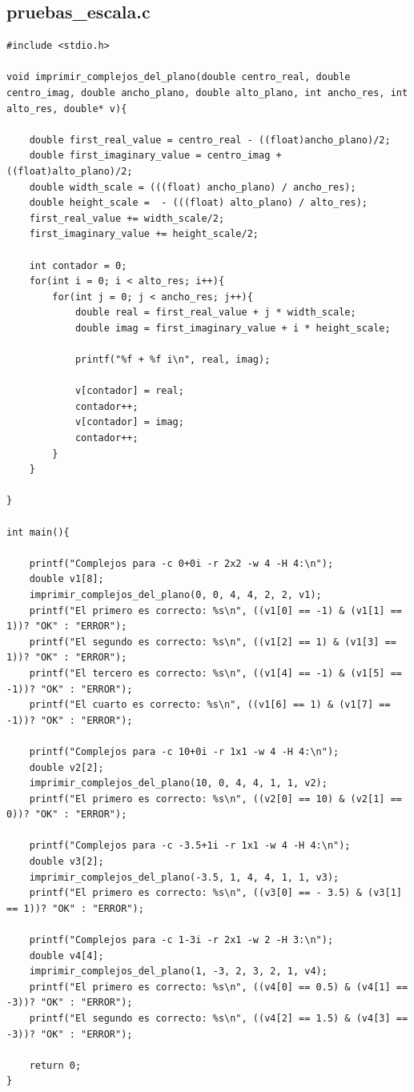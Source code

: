 \documentclass[a4paper,10pt]{article}
\begin{document}
\subsection{pruebas\_escala.c}
\begin{verbatim}
#include <stdio.h>

void imprimir_complejos_del_plano(double centro_real, double centro_imag, double ancho_plano, double alto_plano, int ancho_res, int alto_res, double* v){
	
	double first_real_value = centro_real - ((float)ancho_plano)/2;
    double first_imaginary_value = centro_imag + ((float)alto_plano)/2;
    double width_scale = (((float) ancho_plano) / ancho_res);
    double height_scale =  - (((float) alto_plano) / alto_res);
    first_real_value += width_scale/2;
    first_imaginary_value += height_scale/2;
    
	int contador = 0;
    for(int i = 0; i < alto_res; i++){
        for(int j = 0; j < ancho_res; j++){
			double real = first_real_value + j * width_scale;
			double imag = first_imaginary_value + i * height_scale;
			
			printf("%f + %f i\n", real, imag);
			
			v[contador] = real;
			contador++;
			v[contador] = imag;
			contador++;
		}
	}

}

int main(){

	printf("Complejos para -c 0+0i -r 2x2 -w 4 -H 4:\n");
    double v1[8];
    imprimir_complejos_del_plano(0, 0, 4, 4, 2, 2, v1);
	printf("El primero es correcto: %s\n", ((v1[0] == -1) & (v1[1] == 1))? "OK" : "ERROR");
	printf("El segundo es correcto: %s\n", ((v1[2] == 1) & (v1[3] == 1))? "OK" : "ERROR");
	printf("El tercero es correcto: %s\n", ((v1[4] == -1) & (v1[5] == -1))? "OK" : "ERROR");
	printf("El cuarto es correcto: %s\n", ((v1[6] == 1) & (v1[7] == -1))? "OK" : "ERROR");
	
	printf("Complejos para -c 10+0i -r 1x1 -w 4 -H 4:\n");
    double v2[2];
    imprimir_complejos_del_plano(10, 0, 4, 4, 1, 1, v2);
	printf("El primero es correcto: %s\n", ((v2[0] == 10) & (v2[1] == 0))? "OK" : "ERROR");
	
	printf("Complejos para -c -3.5+1i -r 1x1 -w 4 -H 4:\n");
    double v3[2];
    imprimir_complejos_del_plano(-3.5, 1, 4, 4, 1, 1, v3);
	printf("El primero es correcto: %s\n", ((v3[0] == - 3.5) & (v3[1] == 1))? "OK" : "ERROR");
	
	printf("Complejos para -c 1-3i -r 2x1 -w 2 -H 3:\n");
    double v4[4];
    imprimir_complejos_del_plano(1, -3, 2, 3, 2, 1, v4);
	printf("El primero es correcto: %s\n", ((v4[0] == 0.5) & (v4[1] == -3))? "OK" : "ERROR");
	printf("El segundo es correcto: %s\n", ((v4[2] == 1.5) & (v4[3] == -3))? "OK" : "ERROR");
	
	return 0;
}
\end{verbatim}
\end{document}
